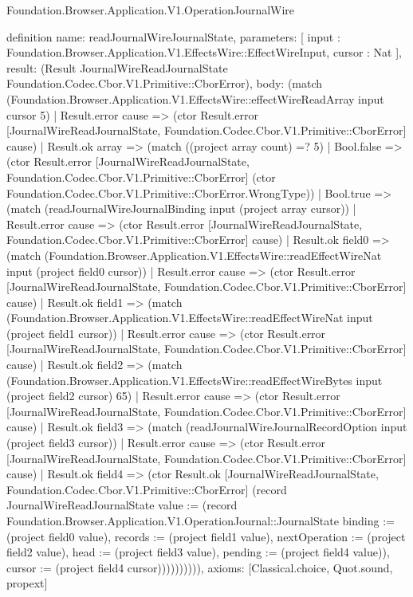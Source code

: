 \begin{lexlean}{Foundation.Browser.Application.V1.OperationJournalWire}
\begin{semanticmodule}
definition{
  name: readJournalWireJournalState,
  parameters: [
    input : Foundation.Browser.Application.V1.EffectsWire::EffectWireInput,
    cursor : Nat
  ],
  result: (Result JournalWireReadJournalState Foundation.Codec.Cbor.V1.Primitive::CborError),
  body: (match (Foundation.Browser.Application.V1.EffectsWire::effectWireReadArray input cursor 5)
    | Result.error cause => (ctor Result.error [JournalWireReadJournalState, Foundation.Codec.Cbor.V1.Primitive::CborError] cause)
    | Result.ok array => (match ((project array count) =? 5)
      | Bool.false => (ctor Result.error [JournalWireReadJournalState, Foundation.Codec.Cbor.V1.Primitive::CborError] (ctor Foundation.Codec.Cbor.V1.Primitive::CborError.WrongType))
      | Bool.true => (match (readJournalWireJournalBinding input (project array cursor))
        | Result.error cause => (ctor Result.error [JournalWireReadJournalState, Foundation.Codec.Cbor.V1.Primitive::CborError] cause)
        | Result.ok field0 => (match (Foundation.Browser.Application.V1.EffectsWire::readEffectWireNat input (project field0 cursor))
          | Result.error cause => (ctor Result.error [JournalWireReadJournalState, Foundation.Codec.Cbor.V1.Primitive::CborError] cause)
          | Result.ok field1 => (match (Foundation.Browser.Application.V1.EffectsWire::readEffectWireNat input (project field1 cursor))
            | Result.error cause => (ctor Result.error [JournalWireReadJournalState, Foundation.Codec.Cbor.V1.Primitive::CborError] cause)
            | Result.ok field2 => (match (Foundation.Browser.Application.V1.EffectsWire::readEffectWireBytes input (project field2 cursor) 65)
              | Result.error cause => (ctor Result.error [JournalWireReadJournalState, Foundation.Codec.Cbor.V1.Primitive::CborError] cause)
              | Result.ok field3 => (match (readJournalWireJournalRecordOption input (project field3 cursor))
                | Result.error cause => (ctor Result.error [JournalWireReadJournalState, Foundation.Codec.Cbor.V1.Primitive::CborError] cause)
                | Result.ok field4 => (ctor Result.ok [JournalWireReadJournalState, Foundation.Codec.Cbor.V1.Primitive::CborError] (record JournalWireReadJournalState {value := (record Foundation.Browser.Application.V1.OperationJournal::JournalState {binding := (project field0 value), records := (project field1 value), nextOperation := (project field2 value), head := (project field3 value), pending := (project field4 value)}), cursor := (project field4 cursor)}))))))))),
  axioms: [Classical.choice, Quot.sound, propext]
}


\end{semanticmodule}
\end{lexlean}
